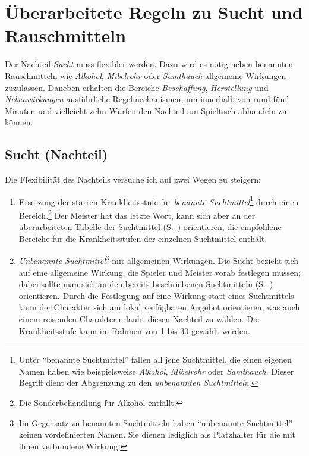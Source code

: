 \chapter{Überarbeitete Regeln zu Sucht und Rauschmitteln}
Der Nachteil \emph{Sucht} muss flexibler werden. Dazu wird es nötig neben benannten Rauschmitteln wie \emph{Alkohol}, \emph{Mibelrohr} oder \emph{Samthauch} allgemeine Wirkungen zuzulassen. Daneben erhalten die Bereiche \emph{Beschaffung}, \emph{Herstellung} und \emph{Nebenwirkungen} ausführliche Regelmechanismen, um innerhalb von rund fünf Minuten und vielleicht zehn Würfen den Nachteil am Spieltisch abhandeln zu können.

\section{Sucht (Nachteil)}
Die Flexibilität des Nachteils versuche ich auf zwei Wegen zu steigern:
\begin{enumerate}
	\item Ersetzung der starren Krankheitsstufe für \emph{benannte Suchtmittel}\footnote{Unter \enquote{benannte Suchtmittel} fallen all jene Suchtmittel, die einen eigenen Namen haben wie beispielsweise \emph{Alkohol}, \emph{Mibelrohr} oder \emph{Samthauch}. Dieser Begriff dient der Abgrenzung zu den \emph{unbenannten Suchtmitteln}.} durch einen Bereich.\footnote{Die Sonderbehandlung für Alkohol entfällt.} Der Meister hat das letzte Wort, kann sich aber an der überarbeiteten \hyperref[tbl-suchtmittel-revised]{Tabelle der Suchtmittel} (S.~\pageref{tbl-suchtmittel-revised}) orientieren, die empfohlene Bereiche für die Krankheitsstufen der einzelnen Suchtmittel enthält.
	\item \emph{Unbenannte Suchtmittel}\footnote{Im Gegensatz zu benannten Suchtmitteln haben \enquote{unbenannte Suchtmittel} keinen vordefinierten Namen. Sie dienen lediglich als Platzhalter für die mit ihnen verbundene Wirkung.} mit allgemeinen Wirkungen. Die Sucht bezieht sich auf eine allgemeine Wirkung, die Spieler und Meister vorab festlegen müssen; dabei sollte man sich an den \hyperref[tbl-suchtmittel]{bereits beschriebenen Suchtmitteln} (S.~\pageref{tbl-suchtmittel}) orientieren. Durch die Festlegung auf eine Wirkung statt eines Suchtmittels kann der Charakter sich am lokal verfügbaren Angebot orientieren, was auch einem reisenden Charakter erlaubt diesen Nachteil zu wählen. Die Krankheitsstufe kann im Rahmen von 1 bis 30 gewählt werden.
\end{enumerate}

